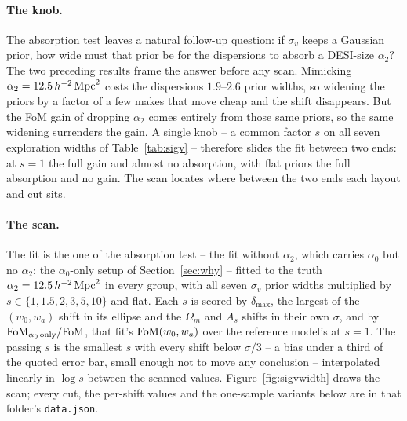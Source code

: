 \documentclass[11pt]{article}
\newcommand{\aunit}{\,h^{-2}\,{\rm Mpc}^2}
\newcommand{\sv}{\sigma_v}
\begin{document}
\paragraph{The knob.}
The absorption test leaves a natural follow-up question: if $\sv$
keeps a Gaussian prior, how wide must that prior be for the
dispersions to absorb a DESI-size $\alpha_2$?  The two preceding
results frame the answer before any scan.  Mimicking
$\alpha_2 = 12.5\aunit$ costs the dispersions $1.9$--$2.6$ prior
widths, so widening the priors by a factor of a few makes that move
cheap and the shift disappears.  But the FoM gain of dropping
$\alpha_2$ comes entirely from those same priors, so the same widening
surrenders the gain.  A single knob -- a common factor $s$ on all
seven exploration widths of Table~\ref{tab:sigv} -- therefore slides
the fit between two ends: at $s = 1$ the full gain and almost no
absorption, with flat priors the full absorption and no gain.  The
scan locates where between the two ends each layout and cut sits.

\paragraph{The scan.}
The fit is the one of the absorption test -- the fit without
$\alpha_2$, which carries $\alpha_0$ but no $\alpha_2$: the
$\alpha_0$-only setup of Section~\ref{sec:why} -- fitted to the truth
$\alpha_2 = 12.5\aunit$ in every group, with all seven $\sv$ prior
widths multiplied by $s \in \{1, 1.5, 2, 3, 5, 10\}$ and flat.  Each
$s$ is scored by $\delta_{\max}$, the largest of the $(w_0, w_a)$
shift in its ellipse and the $\Omega_m$ and $A_s$ shifts in their own
$\sigma$, and by ${\rm FoM}_{\alpha_0\,{\rm only}}/{\rm FoM}$, that
fit's ${\rm FoM}(w_0, w_a)$ over the reference model's at $s = 1$.
The passing $s$ is the smallest $s$ with every shift below $\sigma/3$
-- a bias under a third of the quoted error bar, small enough not to
move any conclusion -- interpolated linearly in $\log s$ between the
scanned values.
Figure~\ref{fig:sigvwidth} draws the scan; every cut, the per-shift
values and the one-sample variants below are in that folder's
\texttt{data.json}.
\end{document}
